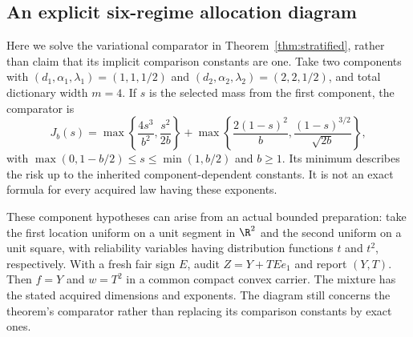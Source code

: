 \subsection{An explicit six-regime allocation diagram}\label{sec:strata-phase}
Here we solve the variational comparator in Theorem~\ref{thm:stratified}, rather than claim that its implicit comparison constants are one. Take two components with $(d_1,\alpha_1,\lambda_1)=(1,1,1/2)$ and $(d_2,\alpha_2,\lambda_2)=(2,2,1/2)$, and total dictionary width $m=4$. If $s$ is the selected mass from the first component, the comparator is
\[
 J_b(s)=\max\left\{\frac{4s^3}{b^2},\frac{s^2}{2b}\right\}
       +\max\left\{\frac{2(1-s)^2}{b},
                     \frac{(1-s)^{3/2}}{\sqrt{2b}}\right\},
\]
with $\max(0,1-b/2)\le s\le\min(1,b/2)$ and $b\ge1$. Its minimum describes the risk up to the inherited component-dependent constants. It is not an exact formula for every acquired law having these exponents.

These component hypotheses can arise from an actual bounded preparation: take the first location uniform on a unit segment in $\R^2$ and the second uniform on a unit square, with reliability variables having distribution functions $t$ and $t^2$, respectively. With a fresh fair sign $E$, audit $Z=Y+TEe_1$ and report $(Y,T)$. Then $f=Y$ and $w=T^2$ in a common compact convex carrier. The mixture has the stated acquired dimensions and exponents. The diagram still concerns the theorem's comparator rather than replacing its comparison constants by exact ones.

